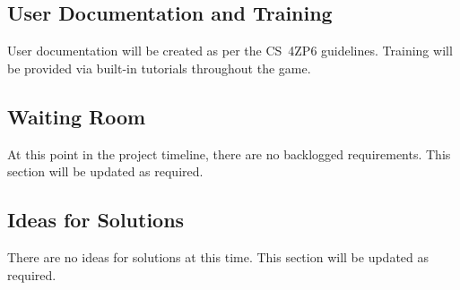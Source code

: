 \documentclass[12pt, titlepage]{article}
\begin{document}
\subsection{User Documentation and Training}
User documentation will be created as per the CS~4ZP6 guidelines.  Training will be provided via built-in tutorials throughout the game.
\subsection{Waiting Room}
At this point in the project timeline, there are no backlogged requirements.  This section will be updated as required.
\subsection{Ideas for Solutions}
There are no ideas for solutions at this time.  This section will be updated as required.
\end{document}
